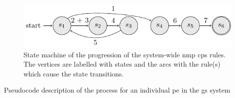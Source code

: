 \begin{figure}
    \centering
    \includegraphics{chapters/nmp/images/systemwidestatemachine.pdf}
    \caption[State machine of the progression of the system-wide  \gls{cps} rules.]{State machine of the progression of the system-wide \gls{nmp} \gls{cps} rules.  The vertices are labelled with states and the arcs with the rule(s) which cause the state transitions.}
    \label{fig:nmp:systemwidestatemachine}
\end{figure}

\begin{algorithm}
\DontPrintSemicolon
{}
\caption[Pseudocode of the  process in the \gls{gs} system]{\label{alg:nmp:systemwide2}Pseudocode description of the process for an individual \gls{pe} in the \gls{gs} system}
\end{algorithm}

